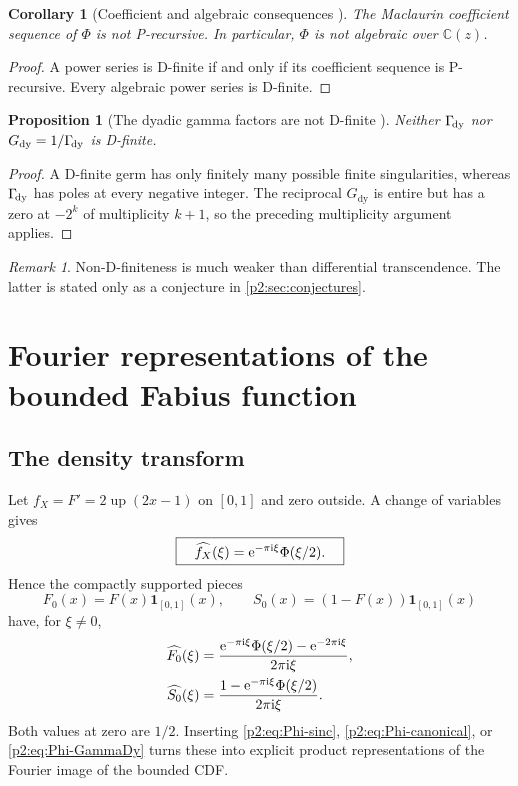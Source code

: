 \documentclass[11pt]{article}
\newtheorem{proposition}[theorem]{Proposition}
\newtheorem{corollary}[theorem]{Corollary}
\theoremstyle{definition}
\theoremstyle{remark}
\newtheorem{remark}[theorem]{Remark}
\newcommand{\C}{\mathbb C}
\newcommand{\Up}{\operatorname{up}}
\begin{document}
\begin{corollary}[Coefficient and algebraic consequences \New]
The Maclaurin coefficient sequence of $\Phi$ is not P-recursive.  In particular, $\Phi$ is
not algebraic over $\C(z)$.
\end{corollary}

\begin{proof}
A power series is D-finite if and only if its coefficient sequence is P-recursive.  Every
algebraic power series is D-finite.
\end{proof}

\begin{proposition}[The dyadic gamma factors are not D-finite \New]
Neither $\Gamma_{\!\mathrm{dy}}$ nor $G_{\mathrm{dy}}=1/\Gamma_{\!\mathrm{dy}}$ is D-finite.
\end{proposition}

\begin{proof}
A D-finite germ has only finitely many possible finite singularities, whereas $\Gamma_{\!\mathrm{dy}}$ has
poles at every negative integer.  The reciprocal $G_{\mathrm{dy}}$ is entire but has a zero
at $-2^k$ of multiplicity $k+1$, so the preceding multiplicity argument applies.
\end{proof}

\begin{remark}
Non-D-finiteness is much weaker than differential transcendence.  The latter is stated only
as a conjecture in \cref{p2:sec:conjectures}.
\end{remark}

\section{Fourier representations of the bounded Fabius function}
\label{p2:sec:F-Fourier}

\subsection{The density transform}

Let $f_X=F'=2\Up(2x-1)$ on $[0,1]$ and zero outside.  A change of variables gives
\begin{equation}
 \boxed{\quad
 \widehat{f_X}(\xi)=\mathrm e^{-\pi\mathrm i\xi}\Phi(\xi/2).
 \quad}                                                  \label{p2:eq:fX-transform}
\end{equation}
Hence the compactly supported pieces
\begin{equation}
 F_0(x)=F(x)\mathbf1_{[0,1]}(x),
 \qquad
 S_0(x)=(1-F(x))\mathbf1_{[0,1]}(x)                      \label{p2:eq:F0S0}
\end{equation}
have, for $\xi\ne0$,
\begin{align}
 \widehat{F_0}(\xi)
 &=\frac{\mathrm e^{-\pi\mathrm i\xi}\Phi(\xi/2)-\mathrm e^{-2\pi\mathrm i\xi}}
 {2\pi\mathrm i\xi},                                         \label{p2:eq:F0-transform}\\
 \widehat{S_0}(\xi)
 &=\frac{1-\mathrm e^{-\pi\mathrm i\xi}\Phi(\xi/2)}{2\pi\mathrm i\xi}.\label{p2:eq:S0-transform}
\end{align}
Both values at zero are $1/2$.  Inserting \eqref{p2:eq:Phi-sinc},
\eqref{p2:eq:Phi-canonical}, or \eqref{p2:eq:Phi-GammaDy} turns these into explicit product
representations of the Fourier image of the bounded CDF.
\end{document}
